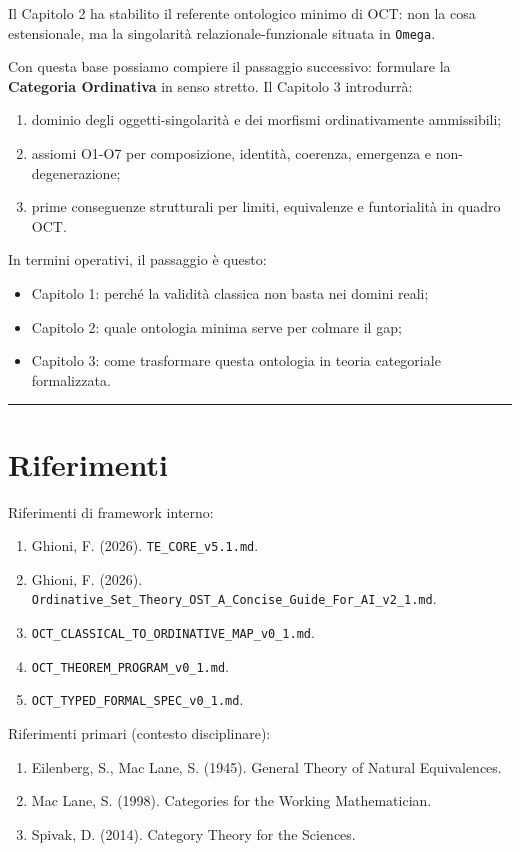 Il Capitolo 2 ha stabilito il referente ontologico minimo di OCT: non la cosa estensionale, ma la singolarità relazionale-funzionale situata in \texttt{Omega}.

Con questa base possiamo compiere il passaggio successivo: formulare la \textbf{Categoria Ordinativa} in senso stretto. Il Capitolo 3 introdurrà:

\begin{enumerate}
\def\labelenumi{\arabic{enumi}.}
\tightlist
\item
  dominio degli oggetti-singolarità e dei morfismi ordinativamente ammissibili;
\item
  assiomi O1-O7 per composizione, identità, coerenza, emergenza e non-degenerazione;
\item
  prime conseguenze strutturali per limiti, equivalenze e funtorialità in quadro OCT.
\end{enumerate}

In termini operativi, il passaggio è questo:

\begin{itemize}
\tightlist
\item
  Capitolo 1: perché la validità classica non basta nei domini reali;
\item
  Capitolo 2: quale ontologia minima serve per colmare il gap;
\item
  Capitolo 3: come trasformare questa ontologia in teoria categoriale formalizzata.
\end{itemize}

\begin{center}\rule{0.5\linewidth}{0.5pt}\end{center}

\section{Riferimenti}

Riferimenti di framework interno:

\begin{enumerate}
\def\labelenumi{\arabic{enumi}.}
\tightlist
\item
  Ghioni, F. (2026). \texttt{TE\_CORE\_v5.1.md}.
\item
  Ghioni, F. (2026). \texttt{Ordinative\_Set\_Theory\_OST\_A\_Concise\_Guide\_For\_AI\_v2\_1.md}.
\item
  \texttt{OCT\_CLASSICAL\_TO\_ORDINATIVE\_MAP\_v0\_1.md}.
\item
  \texttt{OCT\_THEOREM\_PROGRAM\_v0\_1.md}.
\item
  \texttt{OCT\_TYPED\_FORMAL\_SPEC\_v0\_1.md}.
\end{enumerate}

Riferimenti primari (contesto disciplinare):

\begin{enumerate}
\def\labelenumi{\arabic{enumi}.}
\tightlist
\item
  Eilenberg, S., Mac Lane, S. (1945). General Theory of Natural Equivalences.
\item
  Mac Lane, S. (1998). Categories for the Working Mathematician.
\item
  Spivak, D. (2014). Category Theory for the Sciences.
\end{enumerate}
